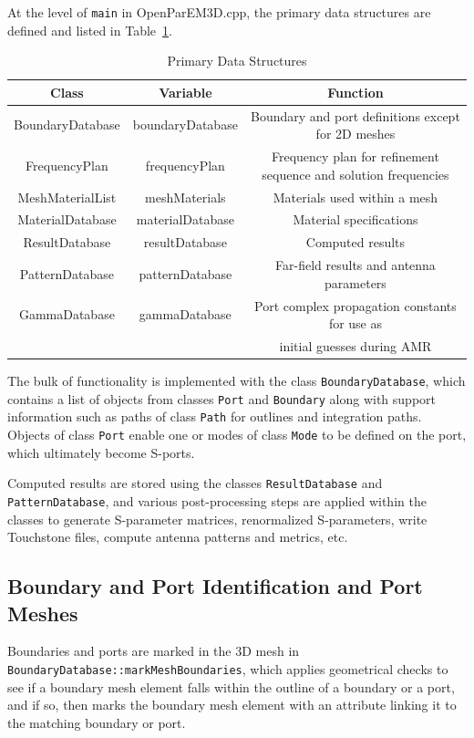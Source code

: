 \documentclass[titlepage]{article}
\renewcommand\_{\textunderscore\linebreak[1]}
\begin{document}
At the level of \texttt{main} in OpenParEM3D.cpp, the primary data structures are defined and listed in Table~\ref{table:data_structures}.
\begin{table}
\small
\caption{Primary Data Structures}
\begin{center}
\begin{tabular}{|c|c|c|}
\hline
Class & Variable & Function \\
\hline
BoundaryDatabase & boundaryDatabase & Boundary and port definitions except for 2D meshes \\
FrequencyPlan & frequencyPlan & Frequency plan for refinement sequence and solution frequencies \\
MeshMaterialList & meshMaterials & Materials used within a mesh \\
MaterialDatabase & materialDatabase & Material specifications \\
ResultDatabase & resultDatabase & Computed results \\
PatternDatabase & patternDatabase & Far-field results and antenna parameters \\
GammaDatabase & gammaDatabase & Port complex propagation constants for use as\\
              &               & initial guesses during AMR \\
\hline
\end{tabular}
\end{center}
\label{table:data_structures}
\end{table}
The bulk of functionality is implemented with the class \texttt{BoundaryDatabase}, which contains a list of objects from classes \texttt{Port} and \texttt{Boundary} along with support information such as paths of class \texttt{Path} for outlines and integration paths.  Objects of class \texttt{Port} enable one or modes of class \texttt{Mode} to be defined on the port, which ultimately become S-ports.

Computed results are stored using the classes \texttt{ResultDatabase} and \texttt{PatternDatabase}, and various post-processing steps are applied within the classes to generate S-parameter matrices, renormalized S-parameters, write Touchstone files, compute antenna patterns and metrics, etc.

\subsection{Boundary and Port Identification and Port Meshes}

Boundaries and ports are marked in the 3D mesh in \texttt{BoundaryDatabase::markMeshBoundaries}, which applies geometrical checks to see if a boundary mesh element falls within the outline of a boundary or a port, and if so, then marks the boundary mesh element with an attribute linking it to the matching boundary or port.
\end{document}

